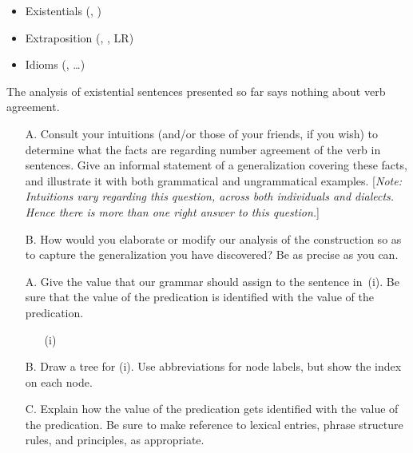 \documentclass[a4paper,landscape,headrule,footrule,dvips]{foils}
\begin{document}

\begin{itemize}
\item Existentials (, )
\item Extraposition (, , LR)
\item Idioms (, \ldots)
\end{itemize}


The analysis of existential  sentences presented so far
says nothing about verb agreement.

\begin{itemize}
\item[A.] Consult your intuitions (and/or those of your friends, if
  you wish) to determine what the facts are regarding number
 agreement of the verb in  sentences.
 Give an informal statement of a generalization covering these facts,
 and illustrate it with both grammatical and ungrammatical examples.
 [{\sl Note: Intuitions vary regarding this question, across both
    individuals and  dialects.  Hence there is more
    than one right answer to this question.}]

\item[B.] How would you elaborate or modify our analysis of the 
  construction so as to capture the generalization you have discovered?
  Be as precise as you can.
\end{itemize}



\begin{itemize}
\item[A.] Give the  value that our grammar should assign to
the sentence in~(i).  Be sure that the  value of the 
predication
is identified with the  value of the 
predication.

\begin{itemize}
\item[(i)] 
\end{itemize}


\item[B.] Draw a tree for (i).  Use abbreviations for node labels, but
  show the index on each node.

\item[C.] Explain how the  value of the  
predication
gets identified with the  value of the  
predication.
Be sure to make reference to lexical entries, phrase structure rules,
and principles, as appropriate.

\end{itemize}
\end{document}

